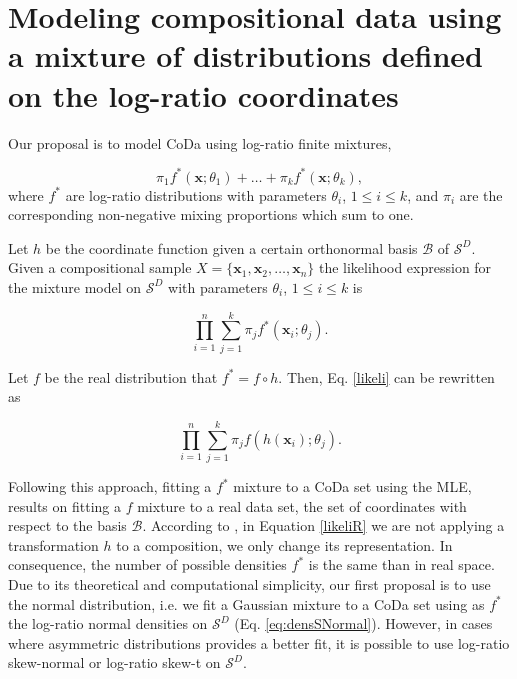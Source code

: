 \documentclass[preprint, review, 3p, authoryear]{elsarticle}
\begin{document}
\section{Modeling compositional data using a mixture of distributions defined on the log-ratio coordinates}
\label{codamix_section}


\noindent Our proposal is to model CoDa using log-ratio finite mixtures,

\begin{equation}\label{coda_mixture}
\pi_1 f^*(\textbf{x}; \theta_1) + \dots + \pi_k f^*(\textbf{x}; \theta_k),
\end{equation}
where $f^*$ are log-ratio distributions with parameters $ \theta_i $, $1\leq i \leq k$, and $\pi_i$ are
the corresponding non-negative mixing proportions which sum to one.

Let $h$ be the coordinate function given a certain orthonormal basis $\mathcal{B}$ of $\mathcal{S}^D$. Given a compositional sample
$X =  \{ \textbf{x}_1, \textbf{x}_2, \dots , \textbf{x}_n \} $  the likelihood expression for the mixture model on $\mathcal{S}^D$ with parameters $ \theta_i $, $1\leq i \leq k$  is

\begin{equation}\label{likeli}
\prod_{i=1}^n \sum_{j=1}^k \pi_j f^*(\textbf{x}_i; \theta_j).
\end{equation}

Let $f$ be the real distribution that $f^* = f \circ h$. Then, Eq. \ref{likeli} can be rewritten as

\begin{equation}\label{likeliR}
\prod_{i=1}^n \sum_{j=1}^k \pi_j f(h(\textbf{x}_i); \theta_j).
\end{equation}

Following this approach, fitting a $f^*$ mixture to a CoDa set using the MLE, results on fitting a $f$ mixture to a real data set, the set of coordinates with respect to the basis $\mathcal{B}$. 
According to \cite{mateu2013normal}, in Equation \ref{likeliR} we are not applying a transformation $h$ to a composition, we only change its representation. In consequence, the number of possible densities $f^*$ is  the same than in real space. Due to its theoretical and computational simplicity, our first proposal is to use the normal distribution, i.e. we fit a Gaussian mixture to a CoDa set using as $f^*$ the log-ratio normal densities on $\mathcal{S}^D$  (Eq. \ref{eq:densSNormal}). However, in cases where asymmetric distributions provides a better fit, it is possible to use log-ratio skew-normal or log-ratio skew-t on $\mathcal{S}^D$. 
\end{document}
